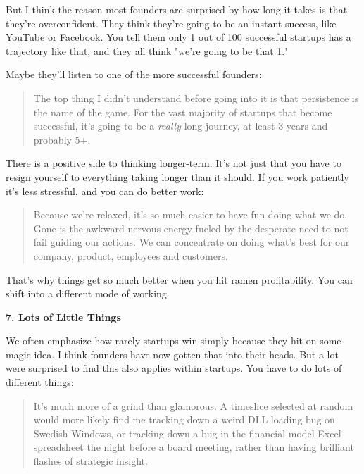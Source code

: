 But I think the reason most founders are
                  surprised by how long it takes is that they're overconfident.
                  They think they're going to be an instant success, like
                  YouTube or Facebook. You tell them only 1 out of 100
                  successful startups has a trajectory like that, and they all
                  think "we're going to be that 1."

Maybe they'll
                  listen to one of the more successful founders:
                  \begin{quote}

                    The top thing I didn't understand before going into it is
                    that persistence is the name of the game. For the vast
                    majority of startups that become successful, it's going to
                    be a \emph{really}
                    long journey, at least 3 years and probably 5+.
                  
\end{quote}

                  There is a positive side to thinking longer-term. It's not
                  just that you have to resign yourself to everything taking
                  longer than it should. If you work patiently it's less
                  stressful, and you can do better work:
                  \begin{quote}

                    Because we're relaxed, it's so much easier to have fun doing
                    what we do. Gone is the awkward nervous energy fueled by the
                    desperate need to not fail guiding our actions. We can
                    concentrate on doing what's best for our company, product,
                    employees and customers.
                  
\end{quote}

                  That's why things get so much better when you hit ramen
                  profitability. You can shift into a different mode of
                  working.

\textbf{7. Lots of Little Things}

We often emphasize how rarely startups win simply
                  because they hit on some magic idea. I think founders have now
                  gotten that into their heads. But a lot were surprised to find
                  this also applies within startups. You have to do lots of
                  different things:
                  \begin{quote}

                    It's much more of a grind than glamorous. A timeslice
                    selected at random would more likely find me tracking down a
                    weird DLL loading bug on Swedish Windows, or tracking down a
                    bug in the financial model Excel spreadsheet the night
                    before a board meeting, rather than having brilliant flashes
                    of strategic insight.
                  
\end{quote}

